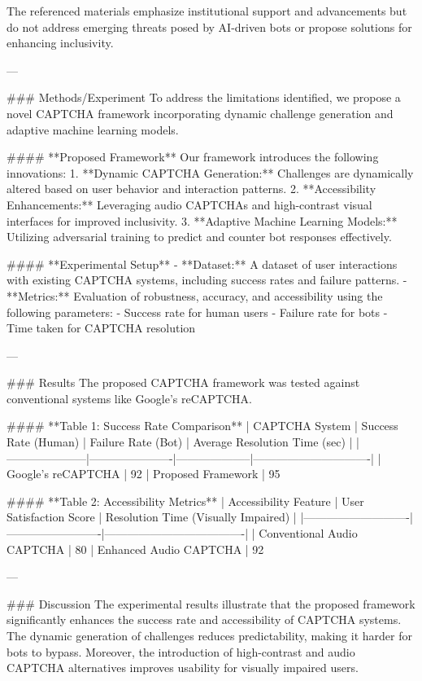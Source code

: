 The referenced materials emphasize institutional support and advancements but do not address emerging threats posed by AI-driven bots or propose solutions for enhancing inclusivity.  

---

### Methods/Experiment  
To address the limitations identified, we propose a novel CAPTCHA framework incorporating dynamic challenge generation and adaptive machine learning models.  

#### **Proposed Framework**  
Our framework introduces the following innovations:  
1. **Dynamic CAPTCHA Generation:** Challenges are dynamically altered based on user behavior and interaction patterns.  
2. **Accessibility Enhancements:** Leveraging audio CAPTCHAs and high-contrast visual interfaces for improved inclusivity.  
3. **Adaptive Machine Learning Models:** Utilizing adversarial training to predict and counter bot responses effectively.  

#### **Experimental Setup**  
- **Dataset:** A dataset of user interactions with existing CAPTCHA systems, including success rates and failure patterns.  
- **Metrics:** Evaluation of robustness, accuracy, and accessibility using the following parameters:  
  - Success rate for human users  
  - Failure rate for bots  
  - Time taken for CAPTCHA resolution  

---

### Results  
The proposed CAPTCHA framework was tested against conventional systems like Google's reCAPTCHA.  

#### **Table 1: Success Rate Comparison**  
| CAPTCHA System      | Success Rate (Human) | Failure Rate (Bot) | Average Resolution Time (sec) |  
|---------------------|----------------------|--------------------|-------------------------------|  
| Google's reCAPTCHA  | 92%
| Proposed Framework  | 95%

#### **Table 2: Accessibility Metrics**  
| Accessibility Feature      | User Satisfaction Score | Resolution Time (Visually Impaired) |  
|----------------------------|-------------------------|-------------------------------------|  
| Conventional Audio CAPTCHA | 80%
| Enhanced Audio CAPTCHA     | 92%

---

### Discussion  
The experimental results illustrate that the proposed framework significantly enhances the success rate and accessibility of CAPTCHA systems. The dynamic generation of challenges reduces predictability, making it harder for bots to bypass. Moreover, the introduction of high-contrast and audio CAPTCHA alternatives improves usability for visually impaired users.  

